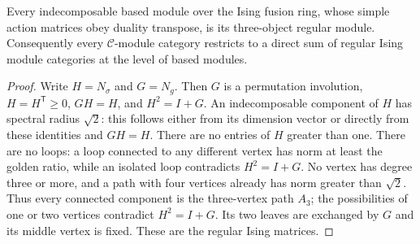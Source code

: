 \begin{lemma}
Every indecomposable based module over the Ising fusion ring, whose
simple action matrices obey duality transpose, is its three-object regular
module. Consequently every $\mathcal C$-module category restricts to a direct sum
of regular Ising module categories at the level of based modules.
\end{lemma}
\begin{proof}
Write $H=N_\sigma$ and $G=N_g$. Then $G$ is a permutation involution,
$H=H^{\mathsf T}\geq0$, $GH=H$, and $H^2=I+G$. An indecomposable
component of $H$ has spectral radius $\sqrt2$: this follows either from
its dimension vector or directly from these identities and $GH=H$.
There are no entries of $H$ greater than one. There are no loops: a loop
connected to any different vertex has norm at least the golden ratio,
while an isolated loop contradicts $H^2=I+G$. No vertex has degree three
or more, and a path with four vertices already has norm greater than
$\sqrt2$. Thus every connected component is the three-vertex path
$A_3$; the possibilities of one or two vertices contradict $H^2=I+G$.
Its two leaves are exchanged by $G$ and its middle vertex is fixed.
These are the regular Ising matrices.
\end{proof}

